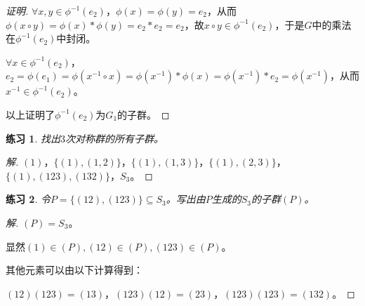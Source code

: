 \documentclass{article}
\newtheorem{Exercise}{练习}
\begin{document}
\begin{CJK*}{UTF8}{gbsn}
\begin{proof}[证明]
  $\forall x,y\in \phi^{-1}(e_2)$，$\phi(x)=\phi(y)=e_2$，从而$\phi(x\circ y)=\phi(x)*\phi(y)=e_2*e_2=e_2$，故$x\circ y\in \phi^{-1}(e_2)$，于是$G$中的乘法在$\phi^{-1}(e_2)$中封闭。

$\forall x\in \phi^{-1}(e_2)$，$e_2=\phi(e_1)=\phi(x^{-1}\circ x)=\phi(x^{-1})*\phi(x)=\phi(x^{-1})*e_2=\phi(x^{-1})$，从而$x^{-1}\in \phi^{-1}(e_2)$。

以上证明了$\phi^{-1}(e_2)$为$G_1$的子群。
\end{proof}
\begin{Exercise}
  找出$3$次对称群的所有子群。
\end{Exercise}
\begin{proof}[解]
  $(1)$，$\{(1),(1,2)\}$，$\{(1),(1,3)\}$，$\{(1),(2,3)\}$，$\{(1),(123),(132)\}$，$S_3$。
\end{proof}

\begin{Exercise}
  令$P=\{(12),(123)\}\subseteq S_3$。写出由$P$生成的$S_3$的子群$(P)$。
\end{Exercise}
\begin{proof}[解]
  $(P)=S_3$。

  显然$(1)\in (P),(12)\in (P),(123)\in (P)$。

  其他元素可以由以下计算得到：

  $(12)(123)=(13)$，$(123)(12)=(23)$，$(123)(123)=(132)$。
\end{proof}
\end{CJK*}
\end{document}
